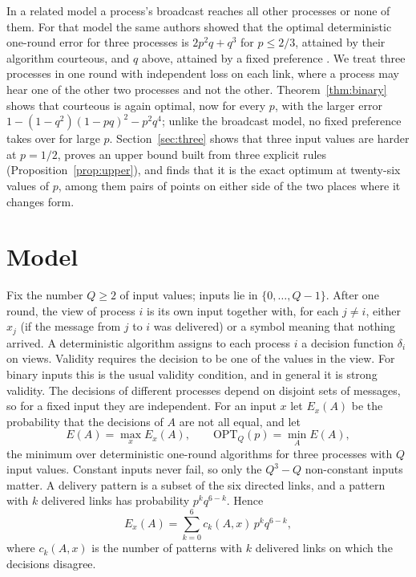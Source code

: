 \documentclass[11pt]{article}
\theoremstyle{remark}
\newcommand{\OPT}{\mathrm{OPT}}
\begin{document}
In a related model a process's broadcast reaches all other processes or none of them. For that model the same authors showed that the optimal deterministic one-round error for three processes is $2p^2q+q^3$ for $p\le2/3$, attained by their algorithm courteous, and $q$ above, attained by a fixed preference \cite{FPR26}. We treat three processes in one round with independent loss on each link, where a process may hear one of the other two processes and not the other. Theorem~\ref{thm:binary} shows that courteous is again optimal, now for every $p$, with the larger error $1-(1-q^2)(1-pq)^2-p^2q^4$; unlike the broadcast model, no fixed preference takes over for large $p$. Section~\ref{sec:three} shows that three input values are harder at $p=1/2$, proves an upper bound built from three explicit rules (Proposition~\ref{prop:upper}), and finds that it is the exact optimum at twenty-six values of $p$, among them pairs of points on either side of the two places where it changes form.

\section{Model}\label{sec:model}
Fix the number $Q\ge2$ of input values; inputs lie in $\{0,\dots,Q-1\}$. After one round, the view of process $i$ is its own input together with, for each $j\neq i$, either $x_j$ (if the message from $j$ to $i$ was delivered) or a symbol meaning that nothing arrived. A deterministic algorithm assigns to each process $i$ a decision function $\delta_i$ on views. Validity requires the decision to be one of the values in the view. For binary inputs this is the usual validity condition, and in general it is strong validity. The decisions of different processes depend on disjoint sets of messages, so for a fixed input they are independent. For an input $x$ let $E_x(A)$ be the probability that the decisions of $A$ are not all equal, and let
\[
E(A)=\max_x E_x(A),\qquad \OPT_{Q}(p)=\min_A E(A),
\]
the minimum over deterministic one-round algorithms for three processes with $Q$ input values. Constant inputs never fail, so only the $Q^3-Q$ non-constant inputs matter. A delivery pattern is a subset of the six directed links, and a pattern with $k$ delivered links has probability $p^kq^{6-k}$. Hence
\begin{equation}\label{eq:counts}
E_x(A)=\sum_{k=0}^{6} c_k(A,x)\,p^kq^{6-k},
\end{equation}
where $c_k(A,x)$ is the number of patterns with $k$ delivered links on which the decisions disagree.
\end{document}
